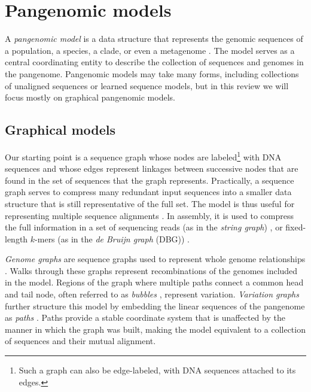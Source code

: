\section{Pangenomic models}

A \emph{pangenomic model} is a data structure that represents the genomic sequences of a population, a species, a clade, or even a metagenome \cite{computational2016computational}.
The model serves as a central coordinating entity to describe the collection of sequences and genomes in the pangenome.
Pangenomic models may take many forms, including collections of unaligned sequences or learned sequence models, but in this review we will focus mostly on graphical pangenomic models.

\subsection{Graphical models}

Our starting point is a sequence graph \cite{hein1989new} whose nodes are labeled\footnote{Such a graph can also be edge-labeled, with DNA sequences attached to its edges.} with DNA sequences and whose edges represent linkages between successive nodes that are found in the set of sequences that the graph represents.
Practically, a sequence graph serves to compress many redundant input sequences into a smaller data structure that is still representative of the full set.
The model is thus useful for representing multiple sequence alignments \cite{hein1989new,Lee_2002}.
In assembly, it is used to compress the full information in a set of sequencing reads (as in the \emph{string graph}) \cite{Myers_2005}, or fixed-length $k$-mers (as in the \emph{de Bruijn graph} (DBG)) \cite{Pevzner_2001}.

\emph{Genome graphs} are sequence graphs used to represent whole genome relationships \cite{Paten_2017}.
Walks through these graphs represent recombinations of the genomes included in the model.
Regions of the graph where multiple paths connect a common head and tail node, often referred to as \emph{bubbles} \cite{paten2018superbubbles}, represent variation.
\emph{Variation graphs} further structure this model by embedding the linear sequences of the pangenome as \emph{paths} \cite{Garrison_2018}.
Paths provide a stable coordinate system that is unaffected by the manner in which the graph was built, making the model equivalent to a collection of sequences and their mutual alignment.

